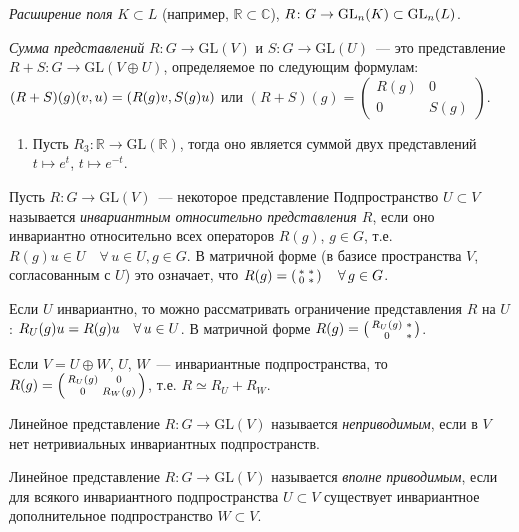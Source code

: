 \documentclass[a4paper]{article}
\newcommand*{\p}[1]{#1\nobreak\discretionary{}{\hbox{$\mathsurround=0pt #1$}}{}}
\begin{document}
\emph{Расширение поля} $K\subset L$ (например,
$\mathbb{R}\subset\mathbb{C}$), $R\colon G\to
\mathrm{GL}_n(K)\p\subset \mathrm{GL}_n(L)$.

\emph{Сумма представлений} $R\colon G\to \mathrm{GL}(V)$ и $S\colon
G\to \mathrm{GL}(U)$~--- это представление $R+S\colon G\to
\mathrm{GL}(V\oplus U)$, определяемое по следующим формулам:
$(R\p+S)(g)(v,u)=(R(g)v, S(g)u)$ или
$(R+S)(g)=\left(\begin{smallmatrix} R(g) & 0\\
0 & S(g)\end{smallmatrix}\right)$.

\begin{ex}
\begin{enumerate}
  \item Пусть $R_3\colon\mathbb{R}\to \mathrm{GL}(\mathbb{R})$, тогда оно
  является суммой двух представлений $t\mapsto e^t$, $t\mapsto e^{-t}$.
\end{enumerate}
\end{ex}
Пусть $R\colon G\to \mathrm{GL}(V)$~--- некоторое представление
Подпространство $U\subset V$ называется \emph{инвариантным
относительно представления $R$}, если оно инвариантно относительно
всех операторов $R(g)$, $g\in G$, т.е. $R(g)u\in U\quad \forall \,
u\in U, g\in G$. В матричной форме (в базисе пространства $V$,
согласованным с $U$) это означает, что
$R(g)\p=\left(\begin{smallmatrix}* & *\\ 0 &
*\end{smallmatrix}\right)\quad \forall \, g\in G$.

Если $U$ инвариантно, то можно рассматривать ограничение
представления $R$ на $U$: $R_U(g)u\p=R(g)u\quad\forall \, u\in U$. В
матричной форме $R(g)\p=\left(\begin{smallmatrix} R_U(g) & *\\ 0 &
*\end{smallmatrix}\right)$.

Если $V=U\oplus W$, $U$, $W$~--- инвариантные подпространства, то
$R(g)\p=\left(\begin{smallmatrix} R_U(g) & 0\\ 0 &
 R_W(g)\end{smallmatrix}\right)$, т.е. $R\simeq R_U+R_W$.

Линейное представление $R\colon G\to \mathrm{GL}(V)$ называется
\emph{неприводимым}, если в $V$ нет нетривиальных инвариантных
подпространств.

Линейное представление $R\colon G\to \mathrm{GL}(V)$ называется
\emph{вполне приводимым}, если для всякого инвариантного
подпространства $U\subset V$ существует инвариантное дополнительное
подпространство $W\subset V$.
\end{document}
